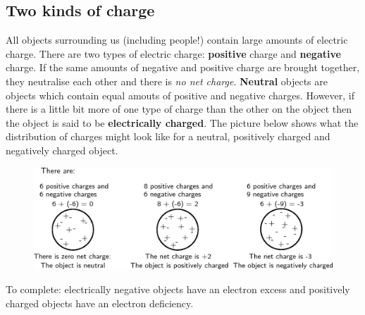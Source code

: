             \subsection{ Two kinds of charge}
            \nopagebreak
      \label{m38780*id200267}All objects surrounding us (including people!) contain large amounts of electric charge. There
are two types of electric charge: \textbf{positive} charge and \textbf{negative} charge.
If the same amounts
of negative and positive charge are brought together, they neutralise each other and there
is \textsl{no net charge}. \textbf{Neutral} objects are objects which contain equal amouts of positive
and negative charges. However, if there is a little bit more of one type of charge than the other on the
object then the object is said to be \textbf{electrically charged}. The picture below shows
what the distribution of charges might look like for a neutral, positively charged and
negatively charged object.\par 
      \label{m38780*id200640}
    \setcounter{subfigure}{0}
	\begin{figure}[H] %
    \begin{center}
    \label{m38780*id200643!!!underscore!!!media}\label{m38780*id200643!!!underscore!!!printimage}\includegraphics[width=0.8\columnwidth]{col11305.imgs/m38780_PG10C8_001.png} %
      \vspace{2pt}
    \vspace{.1in}
    \end{center}
 \end{figure}       
      \par \label{m38780*eip-429}To complete: electrically negative objects have an electron excess and positively charged objects have an electron deficiency.\par 
    \label{m38780*cid5}

